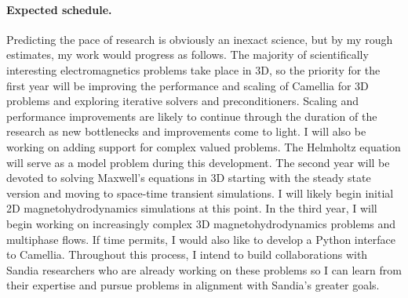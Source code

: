 \documentclass[letterpaper,12pt]{article}
\begin{document}
\paragraph{Expected schedule.}
Predicting the pace of research is obviously an inexact science, but by my rough estimates, my work would progress as follows.
The majority of scientifically interesting electromagnetics problems take place in 3D, so the priority for the first year will 
be improving the performance and scaling of Camellia for 3D problems and exploring iterative solvers and preconditioners.
Scaling and performance improvements are likely to continue through the duration of the research as new bottlenecks and improvements come to light.
I will also be working on adding support for complex valued problems. The Helmholtz equation will serve as a model problem during this development.
The second year will be devoted to solving Maxwell's equations in 3D starting with the steady state version and moving to space-time transient simulations.
I will likely begin initial 2D magnetohydrodynamics simulations at this point.
In the third year, I will begin working on increasingly complex 3D magnetohydrodynamics problems and multiphase flows.
If time permits, I would also like to develop a Python interface to Camellia.
Throughout this process, I intend to build collaborations with Sandia researchers who are already working on these problems so I can 
learn from their expertise and pursue problems in alignment with Sandia's greater goals.
\end{document}
